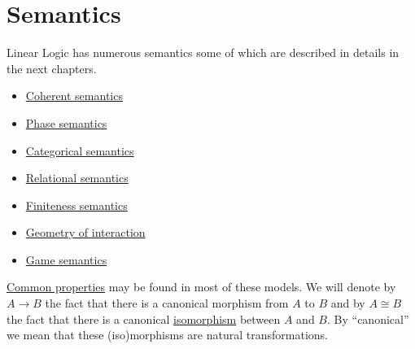 \chapter{Semantics}\label{semantics}

Linear Logic has numerous semantics some of which are described in
details in the next chapters.

\begin{itemize}
\item \hyperref[coherent-semantics]{Coherent semantics}
\item \hyperref[phase-semantics]{Phase semantics}
\item \hyperref[categorical-semantics]{Categorical semantics}
\item \hyperref[relational-semantics]{Relational semantics}
\item \hyperref[finiteness-semantics]{Finiteness semantics}
\item \hyperref[geometry-of-interaction]{Geometry of interaction}
\item \hyperref[game-semantics]{Game semantics}
\end{itemize}

\hyperref[provable-formulas]{Common properties} may be found in most of
these models. We will denote by \(A\longrightarrow B\) the fact that
there is a canonical morphism from \(A\) to \(B\) and by \(A\cong B\)
the fact that there is a canonical \hyperref[isomorphism]{isomorphism} between \(A\) and \(B\). By ``canonical'' we mean that these (iso)morphisms are natural
transformations.


